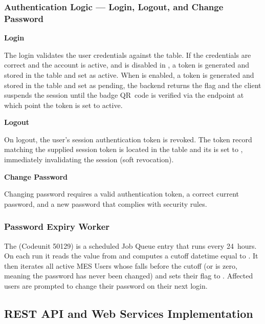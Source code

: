 \subsubsection*{Authentication Logic --- Login, Logout, and Change Password}

\textbf{Login}

The login validates the user credentials against the 
table. If the credentials are correct and the account is active, and
 is disabled in , a token is generated
and stored in the  table and set as active. When  is
enabled, a token is generated
and stored in the  table and set as pending, the backend returns the  flag and the
 client suspends the session until the badge QR~code is
verified via the  endpoint at which point the token is set to active.

\textbf{Logout}

On logout, the user's session authentication token is revoked. The token
record matching the supplied session token is located in the
 table and its  is set to
, immediately invalidating the session (soft revocation).

\textbf{Change Password}

Changing password requires a valid authentication token, a correct current
password, and a new password that complies with security rules.

\subsubsection*{Password Expiry Worker}

The  (Codeunit 50129) is a scheduled
 Job Queue entry that runs every 24~hours. On each
run it reads the  value from 
and computes a cutoff datetime equal to .
It then iterates all active MES Users whose 
falls before the cutoff (or is zero, meaning the password has never been changed)
and sets their  flag to . Affected users
are prompted to change their password on their next login.

\subsection{REST API and Web Services Implementation}

